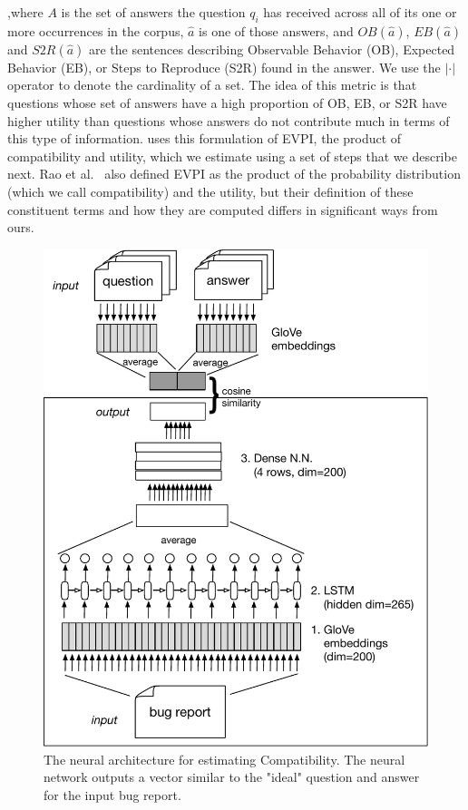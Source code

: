 \noindent
,where $A$ is the set of answers the question $q_{i}$ has received across all of its one or more occurrences in the
corpus, $\hat a$ is one of those answers, and $OB(\hat a)$, $EB(\hat a)$ and $S2R(\hat a)$ are the sentences describing Observable Behavior (OB), Expected Behavior (EB), or
Steps to Reproduce (S2R) found in the answer. We use the $|\cdot|$ operator to denote the cardinality of a set.
The idea of this metric is that questions whose set of answers have a high proportion
of OB, EB, or S2R have higher utility than questions whose answers do not contribute much in
terms of this type of information. \evpi uses this formulation of EVPI, the product of compatibility and utility, which we
estimate using a set of steps that we describe next. Rao et al.~\cite{rao-daume-iii-2018-learning} also defined EVPI as the product of the probability distribution (which we call compatibility) and the utility, but their definition of these constituent terms and how they are computed differs in significant ways from ours.

\begin{figure}[t]
\centering
\includegraphics[width=0.99\linewidth]{figures/compat_nn.pdf}
\caption{The neural architecture for estimating Compatibility. The neural network outputs a vector similar
to the "ideal" question and answer for the input bug report.}
\label{fig:compat_nn}
\end{figure}


